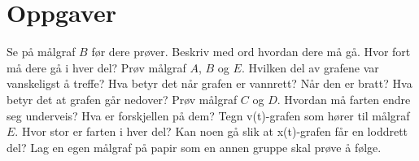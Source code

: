 \documentclass[11pt]{article}
\begin{document}
\section*{Oppgaver}

\begin{oppgaveliste}
\oppgave {}Se på målgraf $B$ før dere prøver. Beskriv med ord hvordan dere må gå. Hvor fort må dere gå i hver del?
\svar
\oppgave {}Prøv målgraf $A$, $B$ og $E$. Hvilken del av grafene var vanskeligst å treffe?
\svar
\oppgave {}Hva betyr det når grafen er vannrett? Når den er bratt? Hva betyr det at grafen går nedover?
\svar
\oppgave {}Prøv målgraf $C$ og $D$. Hvordan må farten endre seg underveis? Hva er forskjellen på dem?
\svar
\oppgave {}Tegn v(t)-grafen som hører til målgraf $E$. Hvor stor er farten i hver del?
\svar
\oppgave {}Kan noen gå slik at x(t)-grafen får en loddrett del? Lag en egen målgraf på papir som en annen gruppe skal prøve å følge.
\svar
\end{oppgaveliste}
\end{document}

